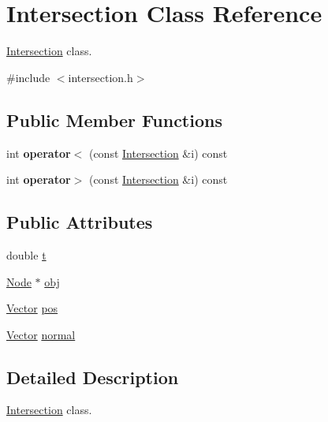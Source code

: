 \hypertarget{class_intersection}{
\section{\-Intersection \-Class \-Reference}
\label{class_intersection}
}


\hyperlink{class_intersection}{\-Intersection} class.  




{\ttfamily \#include $<$intersection.\-h$>$}

\subsection*{\-Public \-Member \-Functions}
\begin{DoxyCompactItemize}
\item 
\hypertarget{class_intersection_aa2c2d7ad56b355eff34091ba1a27aa74}{
int {\bfseries operator$<$} (const \hyperlink{class_intersection}{\-Intersection} \&i) const }
\label{class_intersection_aa2c2d7ad56b355eff34091ba1a27aa74}

\item 
\hypertarget{class_intersection_a7718edebf53d3095ba153a39faf526f8}{
int {\bfseries operator$>$} (const \hyperlink{class_intersection}{\-Intersection} \&i) const }
\label{class_intersection_a7718edebf53d3095ba153a39faf526f8}

\end{DoxyCompactItemize}
\subsection*{\-Public \-Attributes}
\begin{DoxyCompactItemize}
\item 
double \hyperlink{class_intersection_a033072b1892bec18444dbb580063b00a}{t}
\item 
\hyperlink{class_node}{\-Node} $\ast$ \hyperlink{class_intersection_ae73304b7b0497012847612c3200f09d5}{obj}
\item 
\hyperlink{class_vector}{\-Vector} \hyperlink{class_intersection_ade1e9bdd28d83436ea31e55c762ae002}{pos}
\item 
\hyperlink{class_vector}{\-Vector} \hyperlink{class_intersection_aba8efd6d93c445e01f5f91dab79bb37d}{normal}
\end{DoxyCompactItemize}


\subsection{\-Detailed \-Description}
\hyperlink{class_intersection}{\-Intersection} class. 

